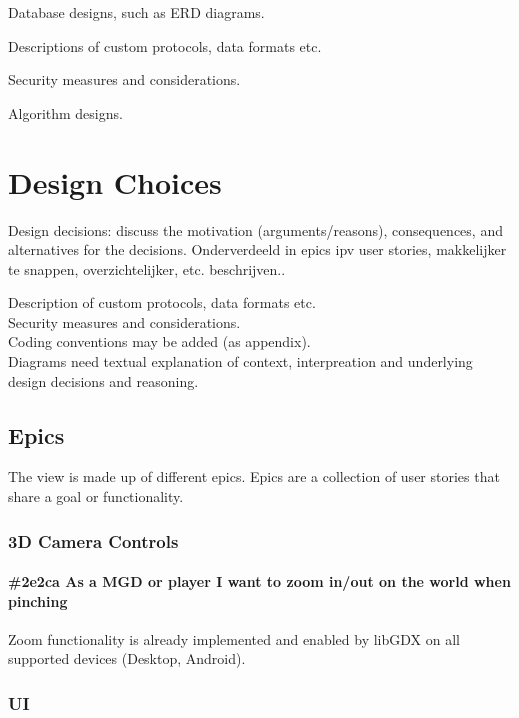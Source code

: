 \documentclass[10pt]{extarticle} %
\begin{document}
    Database designs, such as ERD diagrams.

    Descriptions of custom protocols, data formats etc.

    Security measures and considerations.

    Algorithm designs.

    \newpage

    \section{Design Choices}
    Design decisions: discuss the motivation (arguments/reasons), consequences,
    and alternatives for the decisions.
    Onderverdeeld in epics ipv user stories, makkelijker te snappen, overzichtelijker, etc. beschrijven..

    Description of custom protocols, data formats etc.\\
    Security measures and considerations.\\
    Coding conventions may be added (as appendix).\\
    Diagrams need textual explanation of context, interpreation and underlying design decisions and reasoning.\\

    \subsection{Epics}
    The view is made up of different epics.
    Epics are a collection of user stories that share a goal or functionality.

    \subsubsection{3D Camera Controls}
    \paragraph{\#2e2ca As a MGD or player I want to zoom in/out on the world when pinching}
    Zoom functionality is already implemented and enabled by libGDX on all supported devices (Desktop, Android).

    \subsubsection{UI}
\end{document}
